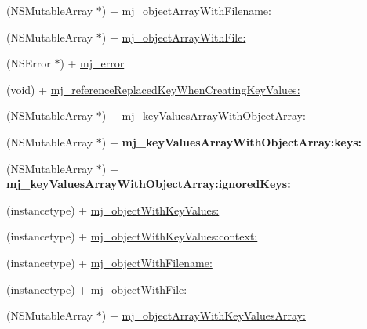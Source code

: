 \begin{DoxyCompactItemize}
\item 
(N\+S\+Mutable\+Array $\ast$) + \mbox{\hyperlink{category_n_s_object_07_m_j_key_value_08_a6e179d7da5def0fe40427b4982a68591}{mj\+\_\+object\+Array\+With\+Filename\+:}}
\item 
(N\+S\+Mutable\+Array $\ast$) + \mbox{\hyperlink{category_n_s_object_07_m_j_key_value_08_ac15e292cdd35db5aae0215cea1e4ff7e}{mj\+\_\+object\+Array\+With\+File\+:}}
\item 
(N\+S\+Error $\ast$) + \mbox{\hyperlink{category_n_s_object_07_m_j_key_value_08_ab6e5a0c2a22f66eda49c4d13327f7607}{mj\+\_\+error}}
\item 
(void) + \mbox{\hyperlink{category_n_s_object_07_m_j_key_value_08_a5ef85ce0a227c02af06d33051a0d77cb}{mj\+\_\+reference\+Replaced\+Key\+When\+Creating\+Key\+Values\+:}}
\item 
(N\+S\+Mutable\+Array $\ast$) + \mbox{\hyperlink{category_n_s_object_07_m_j_key_value_08_ab839459f5ea5711e5c030130431db942}{mj\+\_\+key\+Values\+Array\+With\+Object\+Array\+:}}
\item 
\mbox{\label{category_n_s_object_07_m_j_key_value_08_af594c7b37a1b2c8eb47842f09e61f449}} 
(N\+S\+Mutable\+Array $\ast$) + {\bfseries mj\+\_\+key\+Values\+Array\+With\+Object\+Array\+:keys\+:}
\item 
\mbox{\label{category_n_s_object_07_m_j_key_value_08_a0dfaed3d6d91f165b666058e551dcff6}} 
(N\+S\+Mutable\+Array $\ast$) + {\bfseries mj\+\_\+key\+Values\+Array\+With\+Object\+Array\+:ignored\+Keys\+:}
\item 
(instancetype) + \mbox{\hyperlink{category_n_s_object_07_m_j_key_value_08_a8620ab8d9fd3e832d4f8de504f49724d}{mj\+\_\+object\+With\+Key\+Values\+:}}
\item 
(instancetype) + \mbox{\hyperlink{category_n_s_object_07_m_j_key_value_08_aac86cc29566e0ff89cadb66d79a61db8}{mj\+\_\+object\+With\+Key\+Values\+:context\+:}}
\item 
(instancetype) + \mbox{\hyperlink{category_n_s_object_07_m_j_key_value_08_a44d9d52cc68ef8c354e28ddc5973aecb}{mj\+\_\+object\+With\+Filename\+:}}
\item 
(instancetype) + \mbox{\hyperlink{category_n_s_object_07_m_j_key_value_08_a98ff8a880e1de766fe702c800c1ec70d}{mj\+\_\+object\+With\+File\+:}}
\item 
(N\+S\+Mutable\+Array $\ast$) + \mbox{\hyperlink{category_n_s_object_07_m_j_key_value_08_a4bbc4da54fe5f2fddc993aad366ff617}{mj\+\_\+object\+Array\+With\+Key\+Values\+Array\+:}}

\end{DoxyCompactItemize}
